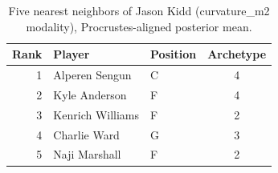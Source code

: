 \begin{table}[htbp]
  \centering\small
  \begin{tabular}{rllc}
    \toprule
    Rank & Player & Position & Archetype \\
    \midrule
    1 & Alperen Sengun & C & 4 \\
    2 & Kyle Anderson & F & 4 \\
    3 & Kenrich Williams & F & 2 \\
    4 & Charlie Ward & G & 3 \\
    5 & Naji Marshall & F & 2 \\
    \bottomrule
  \end{tabular}
  \caption{Five nearest neighbors of Jason Kidd (curvature_m2 modality), Procrustes-aligned posterior mean.}
  \label{tab:Jason_Kidd_neighbors_curvature_m2}
\end{table}

